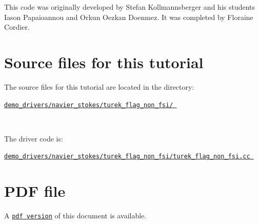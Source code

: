 \begin{DoxyItemize}
\item This code was originally developed by Stefan Kollmannsberger and his students Iason Papaioannou and Orkun Oezkan Doenmez. It was completed by Floraine Cordier.
\end{DoxyItemize}



 

\hypertarget{index_sources}{}\section{Source files for this tutorial}\label{index_sources}

\begin{DoxyItemize}
\item The source files for this tutorial are located in the directory\+:~\newline
~\newline
\begin{center} \href{
../../../../
demo_drivers/navier_stokes/turek_flag_non_fsi/
}{\tt demo\+\_\+drivers/navier\+\_\+stokes/turek\+\_\+flag\+\_\+non\+\_\+fsi/ } \end{center} ~\newline

\item The driver code is\+: ~\newline
~\newline
\begin{center} \href{
../../../../
demo_drivers/navier_stokes/turek_flag_non_fsi/turek_flag_non_fsi.cc
}{\tt demo\+\_\+drivers/navier\+\_\+stokes/turek\+\_\+flag\+\_\+non\+\_\+fsi/turek\+\_\+flag\+\_\+non\+\_\+fsi.\+cc } \end{center} 
\end{DoxyItemize}

 

 \hypertarget{index_pdf}{}\section{P\+D\+F file}\label{index_pdf}
A \href{../latex/refman.pdf}{\tt pdf version} of this document is available. 
